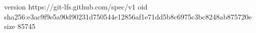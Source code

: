 version https://git-lfs.github.com/spec/v1
oid sha256:e3ac9f9e5a90d90231d750544e12856af1e71dd5b8c6975c3bc8248ab875720e
size 85745

